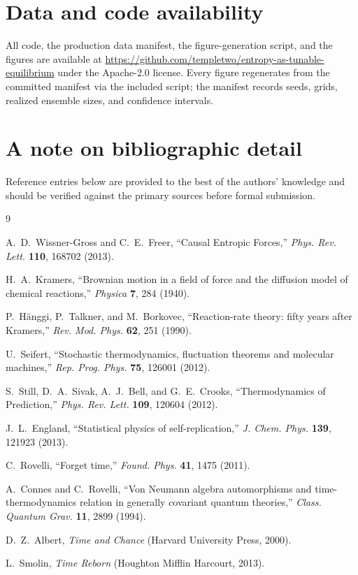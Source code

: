 \documentclass[11pt]{article}
\begin{document}
\section*{Data and code availability}
All code, the production data manifest, the figure-generation script, and the figures are available at \url{https://github.com/templetwo/entropy-as-tunable-equilibrium} under the Apache-2.0 license. Every figure regenerates from the committed manifest via the included script; the manifest records seeds, grids, realized ensemble sizes, and confidence intervals.

\section*{A note on bibliographic detail}
Reference entries below are provided to the best of the authors' knowledge and should be verified against the primary sources before formal submission.

\begin{thebibliography}{9}

 A.~D.~Wissner-Gross and C.~E.~Freer, ``Causal Entropic Forces,'' \emph{Phys. Rev. Lett.} \textbf{110}, 168702 (2013).

 H.~A.~Kramers, ``Brownian motion in a field of force and the diffusion model of chemical reactions,'' \emph{Physica} \textbf{7}, 284 (1940).

 P.~H\"anggi, P.~Talkner, and M.~Borkovec, ``Reaction-rate theory: fifty years after Kramers,'' \emph{Rev. Mod. Phys.} \textbf{62}, 251 (1990).

 U.~Seifert, ``Stochastic thermodynamics, fluctuation theorems and molecular machines,'' \emph{Rep. Prog. Phys.} \textbf{75}, 126001 (2012).

 S.~Still, D.~A.~Sivak, A.~J.~Bell, and G.~E.~Crooks, ``Thermodynamics of Prediction,'' \emph{Phys. Rev. Lett.} \textbf{109}, 120604 (2012).

 J.~L.~England, ``Statistical physics of self-replication,'' \emph{J. Chem. Phys.} \textbf{139}, 121923 (2013).

 C.~Rovelli, ``Forget time,'' \emph{Found. Phys.} \textbf{41}, 1475 (2011).

 A.~Connes and C.~Rovelli, ``Von Neumann algebra automorphisms and time-thermodynamics relation in generally covariant quantum theories,'' \emph{Class. Quantum Grav.} \textbf{11}, 2899 (1994).

 D.~Z.~Albert, \emph{Time and Chance} (Harvard University Press, 2000).

 L.~Smolin, \emph{Time Reborn} (Houghton Mifflin Harcourt, 2013).

\end{thebibliography}
\end{document}
